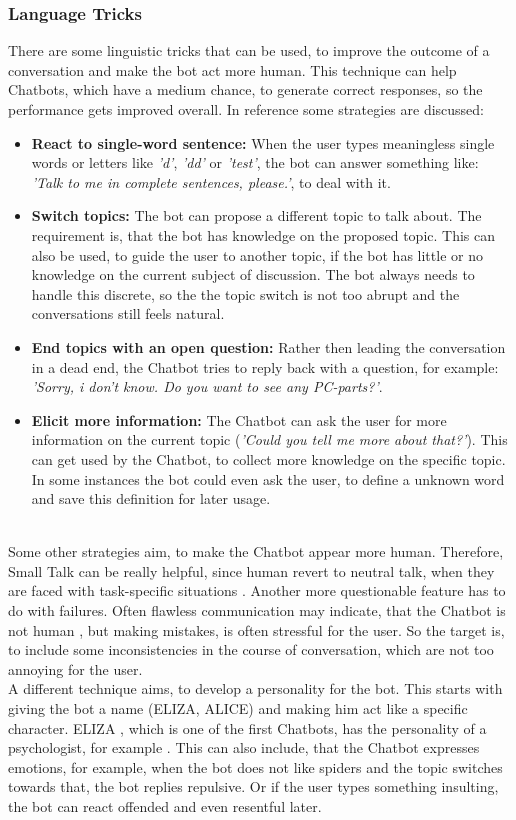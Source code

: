 \documentclass[10pt,final,journal,a4paper,oneside,twocolumn]{IEEEtran}
\begin{document}
\subsubsection{Language Tricks}
There are some linguistic tricks that can be used, to improve the outcome of a conversation and make the bot act more human. This technique can help Chatbots, which have a medium chance, to generate correct responses, so the performance gets improved overall. In reference \cite{b18} some strategies are discussed:
\begin{itemize}
	\item \textbf{React to single-word sentence:} When the user types meaningless single words or letters like \textit{'d'}, \textit{'dd'} or \textit{'test'}, the bot can answer something like: \textit{'Talk to me in complete sentences, please.'}, to deal with it.
	\item \textbf{Switch topics:} The bot can propose a different topic to talk about. The requirement is, that the bot has knowledge on the proposed topic. This can also be used, to guide the user to another topic, if the bot has little or no knowledge on the current subject of discussion. The bot always needs to handle this discrete, so the the topic switch is not too abrupt and the conversations still feels natural.
	\item \textbf{End topics with an open question:} Rather then leading the conversation in a dead end, the Chatbot tries to reply back with a question, for example: \textit{'Sorry, i don't know. Do you want to see any PC-parts?'}.
	\item \textbf{Elicit more information:} The Chatbot can ask the user for more information on the current topic (\textit{'Could you tell me more about that?'}). This can get used by the Chatbot, to collect more knowledge on the specific topic. In some instances the bot could even ask the user, to define a unknown word and save this definition for later usage.
\end{itemize}
\ \\
Some other strategies aim, to make the Chatbot appear more human. Therefore, Small Talk can be really helpful, since human revert to neutral talk, when they are faced with task-specific situations \cite{b19}. Another more questionable feature has to do with failures. Often flawless communication may indicate, that the Chatbot is not human \cite{b19}, but making mistakes, is often stressful for the user. So the target is, to include some inconsistencies in the course of conversation, which are not too annoying for the user.\\
A different technique aims, to develop a personality for the bot. This starts with giving the bot a name (ELIZA, ALICE) and making him act like a specific character. ELIZA \cite{b1}, which is one of the first Chatbots,  has the personality of a psychologist, for example \cite{b19}. This can also include, that the Chatbot expresses emotions, for example, when the bot does not like spiders and the topic switches towards that, the bot replies repulsive. Or if the user types something insulting, the bot can react offended and even resentful later.
\end{document}
